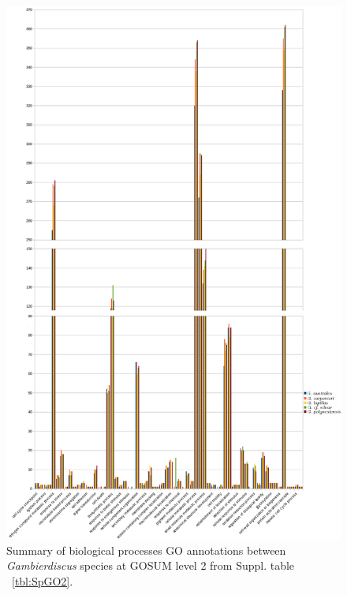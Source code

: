 \documentclass[12pt]{article}
\begin{document}
\begin{figure} 
\includegraphics[scale=.45]{3Aug18_cluster-investigation/figures/gosum-species/Species-gosum2-bio2-split.png} 
\caption{Summary of biological processes GO annotations between \textit{Gambierdiscus} species at GOSUM level 2 from Suppl. table ~\ref{tbl:SpGO2}.} 
\label{fig:SpecGo2Bio}
\end{figure} 
\FloatBarrier
\end{document}
